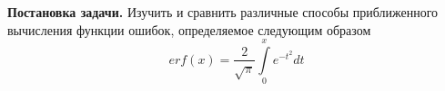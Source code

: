 {\bf Постановка задачи.} Изучить и сравнить различные способы приближенного вычисления функции ошибок, определяемое следующим образом
$$
	erf(x) = \frac{2}{\sqrt{\pi}} \int \limits_0^x e^{-t^2}dt
$$